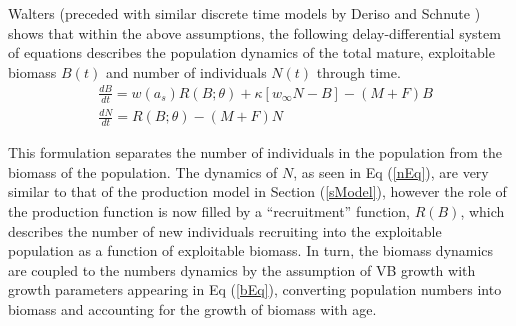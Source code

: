 %
Walters \cite{walters_continuous_2020} (preceded with similar discrete time models 
by Deriso \cite{deriso_harvesting_1980} and Schnute \cite{schnute_general_1985}) 
shows that within the above assumptions, the following delay-differential system of 
equations describes %
the population dynamics of the total mature, exploitable biomass $B(t)$ and number of individuals $N(t)$ through time.
%
\begin{align}%
&\frac{dB}{dt} = w(a_s)R(B;\theta) + \kappa \left[w_\infty N-B\right] - (M+F)B \label{bEq}\\
&\frac{dN}{dt} = R(B;\theta) - (M+F)N \label{nEq}
\end{align}

%
This formulation separates the number of individuals in the population from the
biomass of the population. The dynamics of $N$, as seen in Eq (\ref{nEq}), are
very similar to that of the production model in Section (\ref{sModel}), 
however the role of the production function is now filled by a ``recruitment''
function, $R(B)$, which describes the number of new individuals recruiting into the
exploitable population as a function of exploitable biomass. In turn, the biomass
dynamics are coupled to the numbers dynamics by the assumption of VB growth with
growth parameters appearing in Eq (\ref{bEq}), converting population numbers
into biomass and accounting for the growth of biomass with age.

